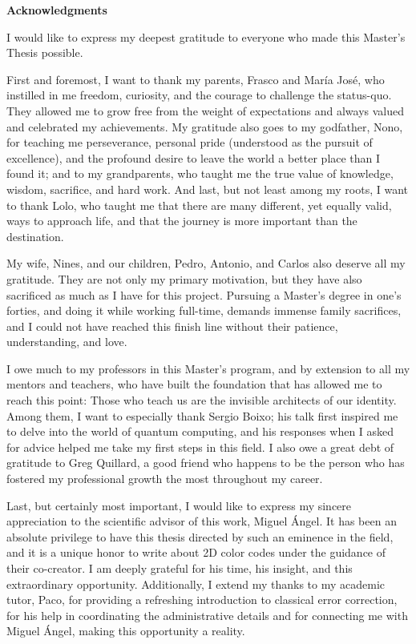\cleardoublepage
{\LARGE\bfseries\color{nebrijared}Acknowledgments\par}
\fontsize{11}{13}\selectfont

\begin{itshape}
I would like to express my deepest gratitude to everyone who made this Master's Thesis possible. 

First and foremost, I want to thank my parents, Frasco and María José, who instilled in me freedom, curiosity, and the courage to challenge the status-quo. They allowed me to grow free from the weight of expectations and always valued and celebrated my achievements. My gratitude also goes to my godfather, Nono, for teaching me perseverance, personal pride (understood as the pursuit of excellence), and the profound desire to leave the world a better place than I found it; and to my grandparents, who taught me the true value of knowledge, wisdom, sacrifice, and hard work. And last, but not least among my roots, I want to thank Lolo, who taught me that there are many different, yet equally valid, ways to approach life, and that the journey is more important than the destination.

My wife, Nines, and our children, Pedro, Antonio, and Carlos also deserve all my gratitude. They are not only my primary motivation, but they have also sacrificed as much as I have for this project. Pursuing a Master's degree in one's forties, and doing it while working full-time, demands immense family sacrifices, and I could not have reached this finish line without their patience, understanding, and love.

I owe much to my professors in this Master's program, and by extension to all my mentors and teachers, who have built the foundation that has allowed me to reach this point: Those who teach us are the invisible architects of our identity. Among them, I want to especially thank Sergio Boixo; his talk first inspired me to delve into the world of quantum computing, and his responses when I asked for advice helped me take my first steps in this field. I also owe a great debt of gratitude to Greg Quillard, a good friend who happens to be the person who has fostered my professional growth the most throughout my career.

Last, but certainly most important, I would like to express my sincere appreciation to the scientific advisor of this work, Miguel Ángel. It has been an absolute privilege to have this thesis directed by such an eminence in the field, and it is a unique honor to write about 2D color codes under the guidance of their co-creator. I am deeply grateful for his time, his insight, and this extraordinary opportunity. Additionally, I extend my thanks to my academic tutor, Paco, for providing a refreshing introduction to classical error correction, for his help in coordinating the administrative details and for connecting me with Miguel Ángel, making this opportunity a reality.
\end{itshape}

